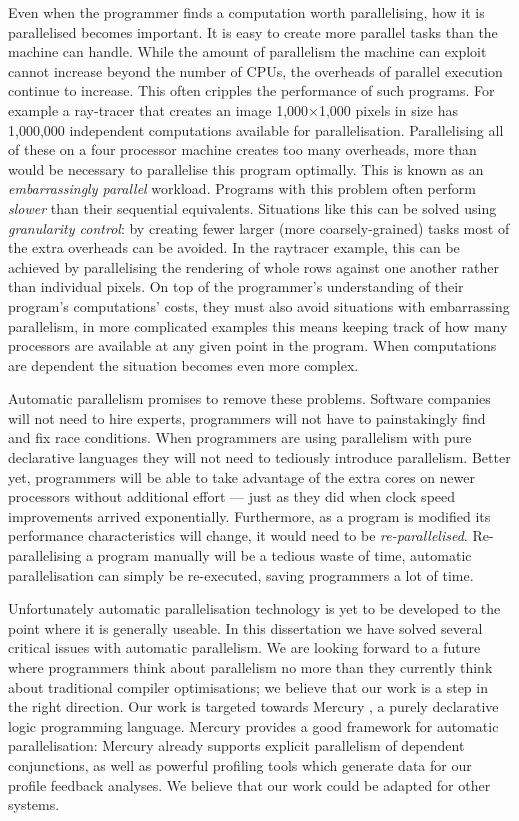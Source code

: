 Even when the programmer finds a computation worth parallelising,
how it is parallelised becomes important.
It is easy to create more parallel tasks than the machine can handle.
While the amount of parallelism the machine can exploit
cannot increase beyond the number of CPUs,
the overheads of parallel execution continue to increase.
This often cripples the performance of such programs.
For example a ray-tracer that creates an image
1,000$\times$1,000 pixels in size has 1,000,000 independent computations
available for parallelisation.
Parallelising all of these on a four processor machine creates too
many overheads, more than would be necessary to parallelise this program
optimally.
This is known as an \emph{embarrassingly parallel} workload.
Programs with this problem often perform \emph{slower} than their sequential
equivalents.
Situations like this can be solved using \emph{granularity control}:
by creating fewer larger (more coarsely-grained) tasks most of the extra
overheads can be avoided.
In the raytracer example, this can be achieved by parallelising the
rendering of whole rows against one another rather than individual pixels.
On top of the programmer's understanding of their program's computations'
costs,
they must also avoid situations with embarrassing parallelism,
in more complicated examples this means keeping track of how many processors
are available at any given point in the program.
When computations are dependent the situation becomes even more complex.

Automatic parallelism promises to remove these problems.
Software companies will not need to hire experts,
programmers will not have to painstakingly find and fix race conditions.
When programmers are using parallelism with pure declarative languages they
will not need to tediously introduce parallelism.
Better yet,
programmers will be able to take advantage of the extra cores on newer
processors without additional effort ---
just as they did when clock speed improvements arrived exponentially.
Furthermore, 
as a program is modified its performance characteristics will change,
it would need to be \emph{re-parallelised}.
Re-parallelising a program manually will be a tedious waste of time,
automatic parallelisation can simply be re-executed, saving programmers a
lot of time.

Unfortunately automatic parallelisation technology is yet to be developed to the
point where it is generally useable.
In this dissertation we have solved several critical issues with automatic
parallelism.
We are looking forward to a future where programmers think about
parallelism no more than they currently think about traditional compiler
optimisations;
we believe that our work is a step in the right direction.
Our work is targeted towards Mercury \citep{mercury_jlp},
a purely declarative logic programming language.
Mercury provides a good framework for automatic parallelisation:
Mercury already supports explicit parallelism of dependent conjunctions,
as well as powerful profiling tools which generate data for our profile
feedback analyses.
We believe that our work could be adapted for other systems.

